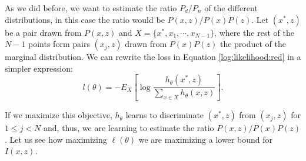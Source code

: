 As we did before, we want to estimate the ratio $P_d/P_n$ of the different distributions, in this case the ratio would be $P(x,z)/P(x)P(z)$. Let $(x^*,z)$ be a pair drawn from $P(x,z)$ and $X = \{x^*, x_1,\cdots,x_{N-1} \}$, where the rest of the $N-1$ points form pairs $(x_j,z)$ drawn from $P(x)P(z)$ the product of the marginal distribution. We can rewrite the loss in Equation \eqref{log:likelihood:red} in a simpler expression:
\begin{equation}\label{log:likelihood:rewritten}
l(\theta) = - E_X \left[ \log \frac{h_\theta(x^*,z)}{\sum_{x \in X}h_\theta(x,z)}\right]  .
\end{equation}

If we maximize this objective, $h_\theta$ learns to discriminate $(x^*,z)$ from $(x_j,z)$ for $ 1 \leq j < N$ and, thus, we are learning to estimate the ratio $P(x,z)/P(x)P(z)$. Let us see how maximizing $\ell(\theta)$ we are maximizing a lower bound for $I(x,z)$.

